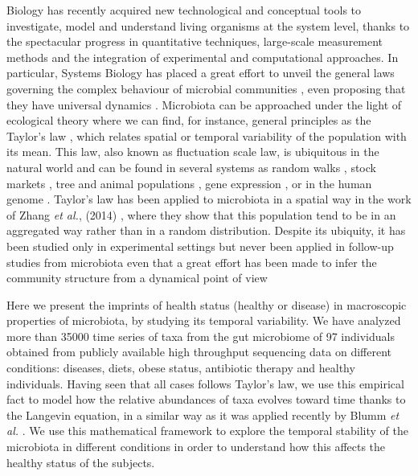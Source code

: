 Biology has recently acquired new technological and conceptual tools to investigate, model and understand living organisms at the system level, thanks to the spectacular progress in quantitative techniques, large-scale measurement methods and the integration of experimental and computational approaches. In particular, Systems Biology has placed a great effort to unveil the general laws governing the complex behaviour of microbial communities \cite{sysbio&microb, msys1, metasysbio}, even proposing that they have universal dynamics \cite{uni_dynam}. Microbiota can be approached under the light of ecological theory where we can find, for instance, general principles as the Taylor's law \cite{taylor}, which relates spatial or temporal variability of the population with its mean. This law, also known as fluctuation scale law, is ubiquitous in the natural world and can be found in several systems as random walks \cite{randomwalks}, stock markets \cite{economics1, economics2}, tree \cite{cohen_taylor} and animal populations \cite{taylor, animal1, animal2}, gene expression \cite{genexpress}, or in the human genome \cite{genome}. Taylor's law has been applied to microbiota in a spatial way in the work of Zhang {\it et al.}, (2014) \cite{isme1}, where they show that this population tend to be in an aggregated way rather than in a random distribution. Despite its ubiquity, it has been studied only in experimental settings \cite{cohen_bac, ramslayer} but never been applied in follow-up studies from microbiota even that a great effort has been made to infer the community structure from a dynamical point of view \cite{cobas, schloss, ravel}  

Here we present the imprints of health status (healthy or disease) in macroscopic properties of microbiota, by studying its temporal variability. We have analyzed more than 35000 time series of taxa from the gut microbiome of 97 individuals obtained from publicly available high throughput sequencing data on different conditions: diseases, diets, obese status, antibiotic therapy and healthy individuals. Having seen that all cases follows Taylor's law, we use this empirical fact to model how the relative abundances of taxa evolves toward time thanks to the Langevin equation, in a similar way as it was applied recently by Blumm {\it et al.} \cite{ranking}. We use this mathematical framework to explore the temporal stability of the microbiota in different conditions in order to understand how this affects the healthy status of the subjects.